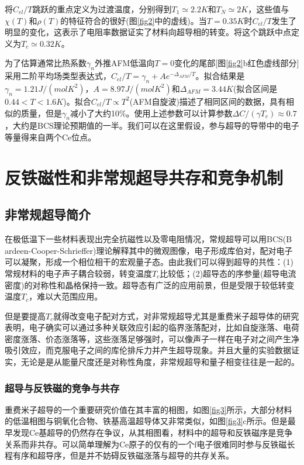 将$C_{el}/T$跳跃的重点定义为过渡温度，分别得到$T_1 \simeq 2.2K$和$T_N \simeq 2K$，这些值与$\chi(T)$和$\rho(T)$的特征符合的很好(图\ref{fig2}中的虚线)。当$T=0.35K$时$C_{el}/T$发生了明显的变化，这表示了电阻率数据证实了材料向超导相的转变。将这个跳跃中点定义为$T_c \simeq 0.32K$。

为了估算通常比热系数$\gamma_n$外推AFM低温向$T=0$变化的尾部[图\ref{fig2}b红色虚线部分]采用二阶平均场类型表达式，$C_{el}/T=\gamma_n + A e^{-\Delta_{AFM}/T}$。拟合结果是$\gamma_n=1.21J/(molK^2)$，$A=8.97J/(molK^2)$和$\Delta_{AFM}=3.44K$(拟合区间是$0.44<T<1.6K$)。拟合$C_{el}/T \propto T^2$(AFM自旋波)描述了相同区间的数据，具有相似的质量，但是$\gamma_n$减小了大约10\%。使用上述参数可以计算参数$\Delta C/(\gamma T_c)\approx 0.7$，大约是BCS理论预期值的一半。我们可以在这里假设，参与超导的导带中的电子等量得来自两个Ce位点。







\section{反铁磁性和非常规超导共存和竞争机制}%
\subsection{非常规超导简介}
在极低温下一些材料表现出完全抗磁性以及零电阻情况，常规超导可以用BCS(B\\ardeen-Cooper-Schrieffer)理论解释其中的微观图像，电子形成库伯对，配对电子可以凝聚，形成一个相位相干的宏观量子态。由此我们可以得到超导的共性：(1)常规材料的电子声子耦合较弱，转变温度$T_c$比较低；(2)超导态的序参量(超导电流密度)的对称性和晶格保持一致。超导态有广泛的应用前景，但是受限于较低转变温度$T_c$，难以大范围应用。

但是要提高$T_c$就得改变电子配对方式，对非常规超导尤其是重费米子超导体的研究表明，电子确实可以通过多种关联效应引起的临界涨落配对，比如自旋涨落、电荷密度涨落、价态涨落等，这些涨落足够强时，可以像声子一样在电子对之间产生净吸引效应，而克服电子之间的库伦排斥力并产生超导现象。并且大量的实验数据证实，无论是是从能量尺度还是对称性角度，非常规超导和量子相变往往是一起的。
\subsubsection{超导与反铁磁的竞争与共存}
重费米子超导的一个重要研究价值在其丰富的相图，如图\ref{fig3}所示，大部分材料的低温相图与铜氧化合物、铁基高温超导体又非常类似，如图\ref{fig3}c所示。但是最早发现Ce基超导的仍然存在争议，从其相图看，材料中的超导和反铁磁序是竞争关系而非共存。可以简单理解为Ce原子的仅有的一个f电子很难同时参与反铁磁长程有序和超导序，但是并不妨碍反铁磁涨落与超导的共存关系。

